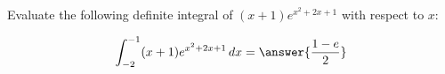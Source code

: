 \documentclass{ximera}
\author{Gregory Hartman \and Matthew Carr}
\begin{document}
\begin{exercise}

Evaluate the following definite integral of $(x+1)e^{x^2+2x+1}$ with respect to $x$:

\[
\int_{-2}^{-1}(x+1)e^{x^2+2x+1}\d x=\answer{\frac{1-e}{2}}
\]


\end{exercise}
\end{document}
